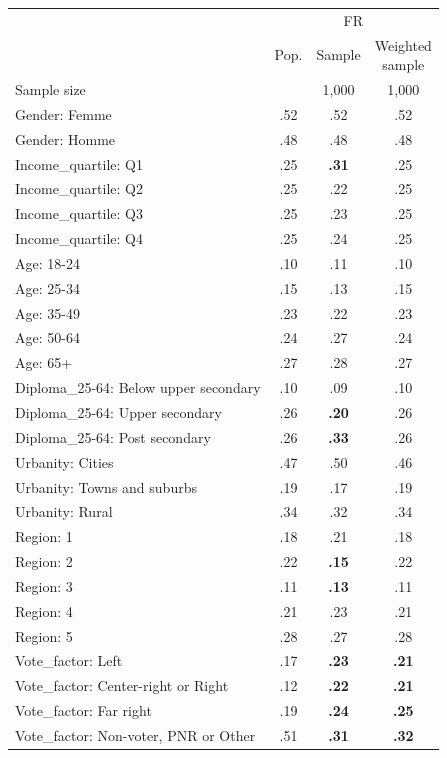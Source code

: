 
\begin{tabular}[t]{lccc}
\toprule
\multicolumn{1}{c}{} & \multicolumn{3}{c}{FR} \\
\cmidrule(l{3pt}r{3pt}){2-4}
  & Pop. & Sample & \makecell{Weighted\\sample}\\
\midrule
Sample size &  & 1,000 & 1,000\\
\addlinespace
Gender: Femme & .52 & .52 & .52\\
Gender: Homme & .48 & .48 & .48\\
\addlinespace
Income\_quartile: Q1 & .25 & \textbf{.31} & .25\\
Income\_quartile: Q2 & .25 & .22 & .25\\
Income\_quartile: Q3 & .25 & .23 & .25\\
Income\_quartile: Q4 & .25 & .24 & .25\\
\addlinespace
Age: 18-24 & .10 & .11 & .10\\
Age: 25-34 & .15 & .13 & .15\\
Age: 35-49 & .23 & .22 & .23\\
Age: 50-64 & .24 & .27 & .24\\
Age: 65+ & .27 & .28 & .27\\
\addlinespace
Diploma\_25-64: Below upper secondary & .10 & .09 & .10\\
Diploma\_25-64: Upper secondary & .26 & \textbf{.20} & .26\\
Diploma\_25-64: Post secondary & .26 & \textbf{.33} & .26\\
\addlinespace
Urbanity: Cities & .47 & .50 & .46\\
Urbanity: Towns and suburbs & .19 & .17 & .19\\
Urbanity: Rural & .34 & .32 & .34\\
\addlinespace
Region: 1 & .18 & .21 & .18\\
Region: 2 & .22 & \textbf{.15} & .22\\
Region: 3 & .11 & \textbf{.13} & .11\\
Region: 4 & .21 & .23 & .21\\
Region: 5 & .28 & .27 & .28\\
\addlinespace
Vote\_factor: Left & .17 & \textbf{.23} & \textbf{.21}\\
Vote\_factor: Center-right or Right & .12 & \textbf{.22} & \textbf{.21}\\
Vote\_factor: Far right & .19 & \textbf{.24} & \textbf{.25}\\
Vote\_factor: Non-voter, PNR or Other & .51 & \textbf{.31} & \textbf{.32}\\
\bottomrule
\end{tabular}